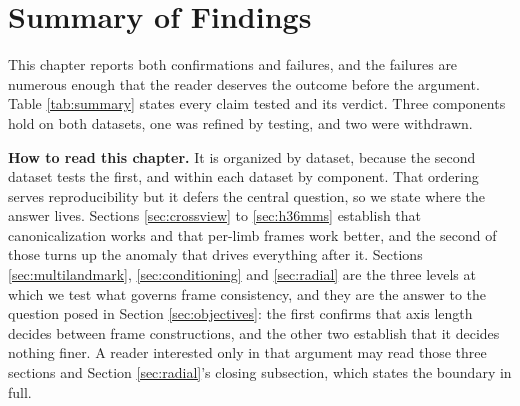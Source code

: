 \documentclass[12pt,a4paper]{report}
\begin{document}
\section{Summary of Findings}

This chapter reports both confirmations and failures, and the failures are numerous enough that the reader deserves the outcome before the argument. Table \ref{tab:summary} states every claim tested and its verdict. Three components hold on both datasets, one was refined by testing, and two were withdrawn.

\textbf{How to read this chapter.} It is organized by dataset, because the second dataset tests the first, and within each dataset by component. That ordering serves reproducibility but it defers the central question, so we state where the answer lives. Sections \ref{sec:crossview} to \ref{sec:h36mms} establish that canonicalization works and that per-limb frames work better, and the second of those turns up the anomaly that drives everything after it. Sections \ref{sec:multilandmark}, \ref{sec:conditioning} and \ref{sec:radial} are the three levels at which we test what governs frame consistency, and they are the answer to the question posed in Section \ref{sec:objectives}: the first confirms that axis length decides between frame constructions, and the other two establish that it decides nothing finer. A reader interested only in that argument may read those three sections and Section \ref{sec:radial}'s closing subsection, which states the boundary in full.
\end{document}
